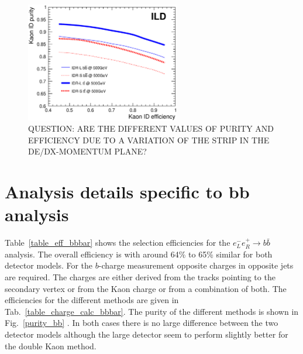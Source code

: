 \documentclass[preprint]{elsarticle}
\begin{document}
\begin{figure}[h!]
\centering
  \includegraphics[width=0.6\textwidth]{figures_Methods/kaonIDeff_v2.eps} 
\caption{QUESTION: ARE THE DIFFERENT VALUES OF PURITY AND EFFICIENCY DUE TO A VARIATION OF THE STRIP IN THE DE/DX-MOMENTUM PLANE?}
\label{kaonID_effpurity}
\end{figure}


\section{Analysis details  specific to bb analysis}

Table~\ref{table_eff_bbbar} shows the selection efficiencies for the $e_{L}^{-}e_{R}^{+}\rightarrow b\bar{b}$ analysis. The overall efficiency is with around 64\% to 65\% 
similar for both detector models. For the $b$-charge measurement opposite charges in opposite jets are required. The charges are either derived from the tracks pointing to the secondary vertex or from the Kaon charge or from a combination of both.  The efficiencies for the different methods are given in Tab.~\ref{table_charge_calc_bbbar}. The purity of the different methods is shown in Fig.~\ref{purity_bb} . In both cases there is no large difference between the two detector models although the large detector seem to perform slightly better for the double Kaon method.

\end{document}
